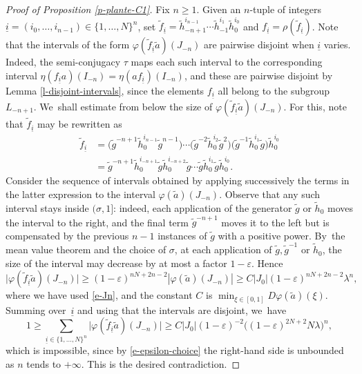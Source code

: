 \documentclass[JEP,XML,SOM,Unicode,NoFloatCountersInSection,published]{cedram}
\theoremstyle{definition}
\begin{document}
\begin{proof}[Proof of Proposition \ref{p-plante-C1}]
Fix $n\geq 1$. Given an $n$-tuple of integers $\underline{i}=(i_0, \ldots, i_{n-1})\in \{1,\ldots,N\}^n$, set $\widetilde{f}_{\underline{i}}=\widetilde{h}_{-n+1}^{i_{n-1}}\cdots \widetilde{h}_{-1}^{i_1} \widetilde{h}_0^{i_0}$ and ${f}_{\underline{i}}=\rho (\widetilde{f}_{\underline{i}})$. Note that the intervals of the form $\varphi(\widetilde{f}_{\underline{i}}\widetilde{a})(J_{-n})$ are pairwise disjoint when $\underline{i}$ varies. Indeed, the semi-conjugacy $\tau$ maps each such interval to the corresponding interval $\eta(f_{\underline{i}}a)(I_{-n})=\eta(af_{\underline{i}})(I_{-n})$, and these are pairwise disjoint by Lemma \ref{l-disjoint-intervals}, since the elements $f_{\underline{i}}$ all belong to the subgroup $L_{-n+1}$. We~shall estimate from below the size of $\varphi(\widetilde{f}_{\underline{i}}\widetilde{a})(J_{-n})$. For this, note that $\widetilde{f}_{\underline{i}}$ may be rewritten as
\begin{align*}
\widetilde{f}_{\underline{i}}&=\bigl (\widetilde{g}^{-n+1}\widetilde{h}_0^{i_{n-1}}\widetilde{g}^{n-1}\bigr)\cdots\bigl (\widetilde{g}^{-2}\widetilde{h}_0^{i_2}\widetilde{g}^2\bigr)\bigl (\widetilde{g}^{-1}\widetilde{h}_0^{i_1}\widetilde{g}\bigr)\widetilde{h}_0^{i_0}\\
&=\widetilde{g}^{-n+1}\widetilde{h}_0^{i_{-n+1}}\widetilde{g}\widetilde{h}_0^{i_{-n+2}}\widetilde{g}\cdots \widetilde{g}\widetilde{h}_0^{i_1}\widetilde{g}\widetilde{h}_0^{i_0}.
\end{align*}
Consider the sequence of intervals obtained by applying successively the terms in the latter expression to the interval $\varphi(\widetilde{a})(J_{-n})$. Observe that any such interval stays inside $(\sigma, 1]$: indeed, each application of the generator $\widetilde{g}$ or $\widetilde{h}_0$ moves the interval to the right, and the final term $\widetilde{g}^{-n+1}$ moves it to the left but is compensated by the previous $n-1$ instances of $\widetilde{g}$ with a positive power. By~the mean value theorem and the choice of $\sigma$, at each application of $\widetilde{g}, \widetilde{g}^{-1}$ or $\widetilde{h}_0$, the size of the interval may decrease by at most a factor $1-\varepsilon$. Hence
\[\bigl |\varphi(\widetilde{f}_{\underline{i}}\widetilde{a})(J_{-n})\bigr |\geq (1-\varepsilon)^{nN+2n-2}\left |\varphi(\widetilde{a})(J_{-n})\right |\geq C|J_0|(1-\varepsilon)^{nN+2n-2}\lambda^n,
\]
where we have used \eqref{e-Jn}, and the constant $C$ is $\min_{\xi\in[0,1]} D\varphi(\widetilde{a})(\xi)$. Summing over~$\underline{i}$ and using that the intervals are disjoint, we~have
\[1\geq \sum_{\underline{i}\in\{1,\ldots,N\}^n}\bigl |\varphi(\widetilde{f}_{\underline{i}}\widetilde{a})(J_{-n})\bigr |\geq C|J_0| (1-\varepsilon)^{-2} \bigl((1-\varepsilon)^{2N+2}N\lambda\bigr)^n,
\]
which is impossible, since by \eqref{e-epsilon-choice} the right-hand side is unbounded as $n$ tends to $+\infty$. This is the desired contradiction.
\end{proof}
\end{document}
